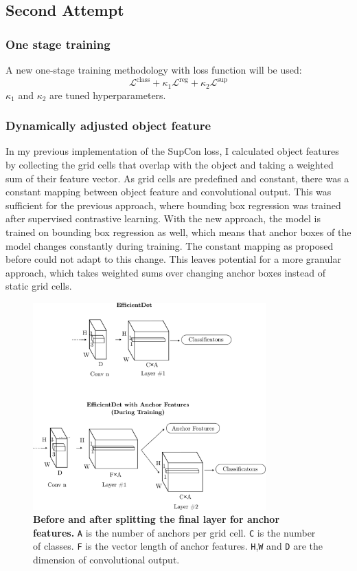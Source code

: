 \documentclass[12pt,a4paper,twoside,openany]{report}
\newcommand{\suploss}{\mathcal{L}^\text{sup}}
\newcommand{\clsloss}{\mathcal{L}^\text{class}}
\newcommand{\regloss}{\mathcal{L}^\text{reg}}
\begin{document}
\subsection{Second Attempt} \label{section: final supcon loss}
\subsubsection{One stage training}
A new one-stage training methodology with loss function will be used:
$$
\clsloss + \kappa_1 \regloss + \kappa_2 \suploss
$$
$\kappa_1$ and $\kappa_2$ are tuned hyperparameters.

\subsubsection{Dynamically adjusted object feature}
In my previous implementation of the SupCon loss, I calculated object features by collecting the grid cells that overlap with the object and taking a weighted sum of their feature vector. As grid cells are predefined and constant, there was a constant mapping between object feature and convolutional output. This was sufficient for the previous approach, where bounding box regression was trained after supervised contrastive learning. With the new approach, the model is trained on bounding box regression as well, which means that anchor boxes of the model changes constantly during training. The constant mapping as proposed before could not adapt to this change. This leaves potential for a more granular approach, which takes weighted sums over changing anchor boxes instead of static grid cells.

\begin{figure}[H]
    \centering
    \includegraphics[width=0.8\textwidth]{figs/implementation/efficientdet_new_head.png}
    \caption{\textbf{Before and after splitting the final layer for anchor features.} \texttt{A} is the number of anchors per grid cell. \texttt{C} is the number of classes. \texttt{F} is the vector length of anchor features. \texttt{H},\texttt{W} and \texttt{D} are the dimension of convolutional output.}
    \label{fig:edet_new_head}
\end{figure}
\end{document}

